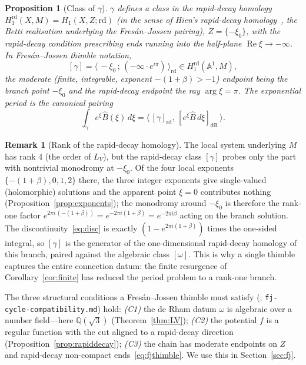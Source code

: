 \documentclass[11pt,reqno]{amsart}
\renewcommand{\_}{\vquadorigunderscore\allowbreak}
\theoremstyle{plain}
\newtheorem{proposition}[theorem]{Proposition}
\theoremstyle{definition}
\newtheorem{remark}[theorem]{Remark}
\newcommand{\Bhat}{\widehat{B}}
\newcommand{\LV}{L_{V}}
\newcommand{\Qsqrt}{\mathbb{Q}(\sqrt3)}
\newcommand{\xizero}{\xi_0}
\begin{document}
\begin{proposition}[Class of $\gamma$]\label{prop:fjclass}
$\gamma$ defines a class in the rapid-decay homology
$H_1^{\mathrm{rd}}(X,M)=H_1(X,Z;\mathrm{rd})$ (in the sense of Hien's rapid-decay
homology~\cite{Hien}, the Betti realisation underlying the Fres\'an--Jossen pairing), $Z=\{-\xizero\}$, with the rapid-decay condition
prescribing ends running into the half-plane $\operatorname{Re}\xi\to-\infty$. In Fres\'an--Jossen
thimble notation,
\begin{equation}\label{eq:fjthimble}
  [\gamma]=\bigl\langle\,-\xizero\,;\,(-\infty\cdot e^{i\pi})\,\bigr\rangle_{\mathrm{rd}}
  \in H_1^{\mathrm{rd}}(\mathbb{A}^1,M),
\end{equation}
the moderate (finite, integrable, exponent $-(1+\beta)>-1$) endpoint being the branch point
$-\xizero$ and the rapid-decay endpoint the ray $\arg\xi=\pi$. The exponential period is the
canonical pairing
\begin{equation}\label{eq:fjpairing}
  \int_\gamma e^{\xi}\Bhat(\xi)\,d\xi
  =\bigl\langle\,[\gamma]_{\mathrm{rd}},\,[e^{\xi}\Bhat\,d\xi]_{\mathrm{dR}}\,\bigr\rangle .
\end{equation}
\end{proposition}

\begin{remark}[Rank of the rapid-decay homology]\label{rmk:rank}
The local system underlying $M$ has rank $4$ (the order of $\LV$), but the rapid-decay class
$[\gamma]$ probes only the part with nontrivial monodromy at $-\xizero$. Of the four local
exponents $\{-(1+\beta),0,1,2\}$ there, the three integer exponents give single-valued
(holomorphic) solutions and the apparent point $\xi=0$ contributes nothing
(Proposition~\ref{prop:exponents}); the monodromy around $-\xizero$ is therefore the rank-one
factor $e^{2\pi i\,(-(1+\beta))}=e^{-2\pi i(1+\beta)}=e^{-2\pi i\beta}$ acting on the branch
solution. The discontinuity~\eqref{eq:disc} is exactly $(1-e^{2\pi i(1+\beta)})$ times the
one-sided integral, so $[\gamma]$ is the generator of the one-dimensional rapid-decay homology of
this branch, paired against the algebraic class $[\omega]$. This is why a single thimble captures
the entire connection datum: the finite resurgence of Corollary~\ref{cor:finite} has reduced the
period problem to a rank-one branch.
\end{remark}

The three structural conditions a Fres\'an--Jossen thimble must satisfy
(\cite{FJ}; \texttt{fj-cycle-compatibility.md}) hold: \emph{(C1)} the de Rham datum $\omega$ is
algebraic over a number field---here $\Qsqrt$ (Theorem~\ref{thm:LV}); \emph{(C2)} the potential $f$
is a regular function with the cut aligned to a rapid-decay direction
(Proposition~\ref{prop:rapiddecay}); \emph{(C3)} the chain has moderate endpoints on $Z$ and
rapid-decay non-compact ends~\eqref{eq:fjthimble}. We use this in Section~\ref{sec:fj}.
\end{document}
